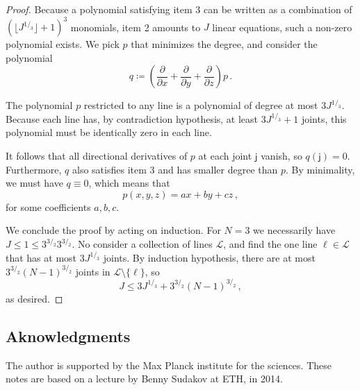 \documentclass[12pt]{amsart}
\theoremstyle{definition}
\newcommand{\vj}{\mathsf{j}}
\begin{document}
\begin{proof}
Because a polynomial satisfying item 3 can be written as a combination of $(\lfloor J^{1/_3}\rfloor + 1)^3$ monomials, item 2 amounts to $J$ linear equations, such a non-zero polynomial exists.
We pick $p$ that minimizes the degree, and consider the polynomial
$$q \coloneqq \left(\frac{\partial}{\partial x} + \frac{\partial}{\partial y} + \frac{\partial}{\partial z} \right) p \, .$$

The polynomial $p$ restricted to any line is a polynomial of degree at most $3J^{1/_3}$.
Because each line has, by contradiction hypothesis, at least $3 J^{1/_3} + 1$ joints, this polynomial must be identically zero in each line.

It follows that all directional derivatives of $p$ at each joint $\vj$ vanish, so $q(\vj) = 0$.
Furthermore, $q$ also satisfies item 3 and has smaller degree than $p$.
By minimality, we must have $q \equiv 0$, which means that 
$$ p(x, y, z ) = ax +by + cz \, ,$$
for some coefficients $a, b, c$.


We conclude the proof by acting on induction. For $N = 3$ we necessarily have $J\leq 1 \leq 3^{3/_2} 3^{3/_2}$.
No consider a collection of lines $\mathcal L$, and find the one line $\ell \in \mathcal L$ that has at most $3 J^{1/_3}$ joints.
By induction hypothesis, there are at most $3^{3/_2} (N-1)^{3/_2}$ joints in $\mathcal L \setminus \{\ell \}$, so 
$$ J \leq 3 J^{1/_3} + 3^{3/_2} (N-1)^{3/_2}\, , $$
as desired.
\end{proof}

\subsection*{Aknowledgments}
The author is supported by the Max Planck institute for the sciences. 
These notes are based on a lecture by Benny Sudakov at ETH, in 2014.



\end{document}
